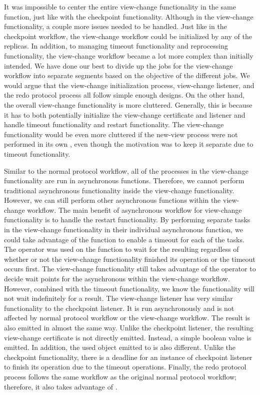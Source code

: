 \iffalse
It was impossible to center the entire view-change functionality in the same function, just like with the checkpoint functionality. Although in the view-change functionality, a couple more issues needed to be handled. Just like in the checkpoint workflow, the view-change workflow could be initialized by any of the replicas. In addition, to managing timeout functionality and reprocessing functionality, the view-change workflow became a lot more complex than initially intended. We have done our best to divide up the jobs for the view-change workflow into separate segments based on the objective of the different jobs.  We would argue that the view-change initialization process, view-change listener, and the redo protocol process all follow simple enough designs.  On the other hand, the overall view-change functionality is more cluttered.  Generally, this is because it has to both potentially initialize the view-change certificate and listener and handle timeout functionality and restart functionality. The view-change functionality would be even more cluttered if the new-view process were not performed in its own , even though the motivation was to keep it separate due to timeout functionality. 

Similar to the normal protocol workflow, all of the processes in the view-change functionality are run in  asynchronous functions. Therefore, we cannot perform traditional asynchronous functionality inside the view-change functionality. However, we can still perform other asynchronous  functions within the view-change workflow. 
The main benefit of asynchronous workflow for view-change functionality is to handle the restart functionality. By performing separate tasks in the view-change functionality in their individual asynchronous function, we could take advantage of the  function to enable a timeout for each of the tasks.  The  operator was used on the  function to wait for the resulting  regardless of whether or not the view-change functionality finished its operation or the timeout occurs first. The view-change functionality still takes advantage of the  operator to decide wait points for the asynchronous  within the view-change workflow. However, combined with the timeout functionality, we know the functionality will not wait indefinitely for a result. 
The view-change listener has very similar functionality to the checkpoint listener. It is run asynchronously and is not affected by normal protocol workflow or the view-change workflow. The result is also emitted in almost the same way. Unlike the checkpoint listener, the resulting view-change certificate is not directly emitted. Instead, a simple boolean value is emitted. In addition, the used  object emitted to is also different. Unlike the checkpoint functionality, there is a deadline for an instance of checkpoint listener to finish its operation due to the timeout operations. Finally, the redo protocol process follows the same workflow as the original normal protocol workflow; therefore, it also takes advantage of .

